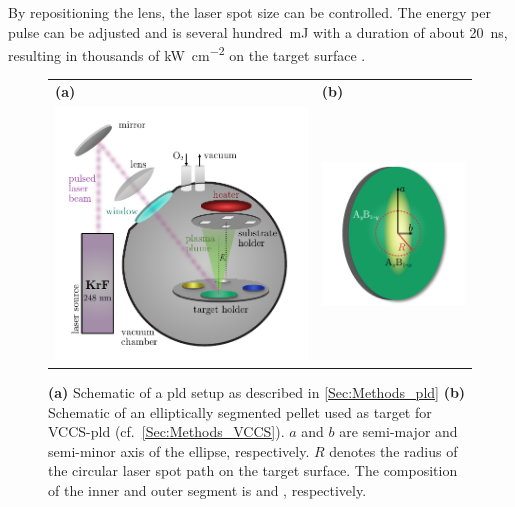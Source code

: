 By repositioning the lens, the laser spot size can be controlled.
The energy per pulse can be adjusted and is several hundred~\unit{\mJ} with a duration of about \qty{20}{\ns}, resulting in thousands of \unit{\kW\per\square\cm} on the target surface
    \cite{lorenz2019}.
\begin{figure}
    \centering
    \begin{tabular}{ll}
        \textbf{(a)}&\textbf{(b)}\\
        \includegraphics[width=9cm,align=c]{fastImages/PLD.pdf}&
        \includegraphics[width=5cm,align=c]{fastImages/target.pdf}  
    \end{tabular}
    \caption{\textbf{(a)} Schematic of a \gls{pld} setup as described in \ref{Sec:Methods_pld} \textbf{(b)} Schematic of an elliptically segmented pellet used as target for \acrshort{VCCS}-\gls{pld} (cf.~\ref{Sec:Methods_VCCS}).
    $a$ and $b$ are semi-major and semi-minor axis of the ellipse, respectively.
    $R$ denotes the radius of the circular laser spot path on the target surface.
    The composition of the inner and outer segment is  and , respectively.}
    \label{Fig:Methods_pld}
\end{figure}

